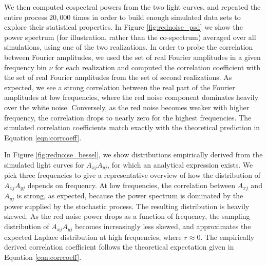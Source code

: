 \documentclass[fleqn,usenatbib]{mnras}
\begin{document}
We then computed cospectral powers from the two light curves, and repeated the entire process $20,000$ times in order to build enough simulated data sets to explore their statistical properties. In Figure \ref{fig:rednoise_psd} we show the power spectrum (for illustration, rather than the co-spectrum) averaged over all simulations, using one of the two realizations. In order to probe the correlation between Fourier amplitudes, we used the set of real Fourier amplitudes in a given frequency bin $\nu$ for each realization and computed the correlation coefficient with the set of real Fourier amplitudes from the set of second realizations. As expected, we see a strong correlation between the real part of the Fourier amplitudes at low frequencies, where the red noise component dominates heavily over the white noise. Conversely, as the red noise becomes weaker with higher frequency, the correlation drops to nearly zero for the highest frequencies. The simulated correlation coefficients match exactly with the theoretical prediction in Equation \ref{eqn:corrcoeff}.

In Figure \ref{fig:rednoise_bessel}, we show distributions empirically derived from the simulated light curves for $A_{xj}A_{yj}$, for which an analytical expression exists. We pick three frequencies to give a representative overview of how the distribution of $A_{xj}A_{yj}$ depends on frequency. At low frequencies, the correlation between $A_{xj}$ and $A_{yj}$ is strong, as expected, because the power spectrum is dominated by the power supplied by the stochastic process. The resulting distribution is heavily skewed. As the red noise power drops as a function of frequency, the sampling distribution of $A_{xj}A_{yj}$ becomes increasingly less skewed, and approximates the expected Laplace distribution at high frequencies, where $r \approx 0$. The empirically derived correlation coefficient follows the theoretical expectation given in Equation \ref{eqn:corrcoeff}.
\end{document}
